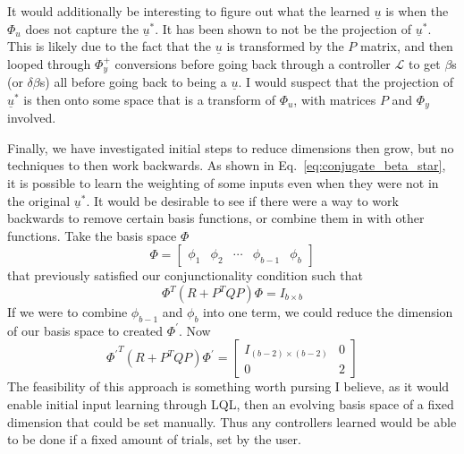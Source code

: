 It would additionally be interesting to figure out what the learned $\underline{u}$ is when the $\Phi_u$ does not capture the $\underline{u}^\ast$. It has been shown to not be the projection of $\underline{u}^\ast$. This is likely due to the fact that the $\underline{u}$ is transformed by the $P$ matrix, and then looped through $\Phi_y^+$ conversions before going back through a controller $\mathcal{L}$ to get $\beta$s (or $\delta \beta$s) all before going back to being a $\underline{u}$. I would suspect that the projection of $\underline{u}^\ast$ is then onto some space that is a transform of $\Phi_u$, with matrices $P$ and $\Phi_y$ involved.

Finally, we have investigated initial steps to reduce dimensions then grow, but no techniques to then work backwards. As shown in Eq.~\ref{eq:conjugate_beta_star}, it is possible to learn the weighting of some inputs even when they were not in the original $\underline{u}^\ast$. It would be desirable to see if there were a way to work backwards to remove certain basis functions, or combine them in with other functions. Take the basis space $\Phi$
\begin{equation}
    \Phi = 
    \begin{bmatrix}
        \phi_1 & \phi_2 & \cdots & \phi_{b-1} & \phi_{b}
    \end{bmatrix}
\end{equation}
that previously satisfied our conjunctionality condition such that
\begin{equation}
    \Phi^T (R + P^T Q P) \Phi = I_{b \times b}
\end{equation}
If we were to combine $\phi_{b-1}$ and $\phi_{b}$ into one term, we could reduce the dimension of our basis space to created $\Phi^\prime$. Now
\begin{equation}
    {\Phi^\prime}^T (R + P^T Q P) \Phi^\prime 
    = 
    \begin{bmatrix}
        I_{(b-2) \times (b-2)} & 0 \\
        0 & 2
    \end{bmatrix}
\end{equation}
The feasibility of this approach is something worth pursing I believe, as it would enable initial input learning through LQL, then an evolving basis space of a fixed dimension that could be set manually. Thus any controllers learned would be able to be done if a fixed amount of trials, set by the user.
